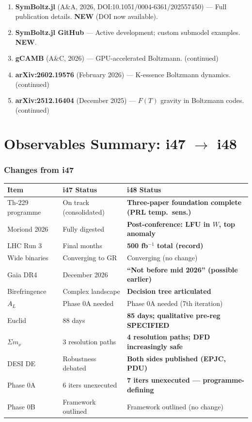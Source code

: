 \documentclass[11pt,a4paper]{article}
\newcommand{\NEW}{\textcolor{dfdblue}{\textbf{NEW}}}
\begin{document}
\begin{enumerate}
\item \textbf{SymBoltz.jl} (A\&A, 2026, DOI:10.1051/0004-6361/202557450) --- Full publication details. \NEW{} (DOI now available).
\item \textbf{SymBoltz.jl GitHub} --- Active development; custom submodel examples. \NEW.
\item \textbf{gCAMB} (A\&C, 2026) --- GPU-accelerated Boltzmann. (continued)
\item \textbf{arXiv:2602.19576} (February 2026) --- K-essence Boltzmann dynamics. (continued)
\item \textbf{arXiv:2512.16404} (December 2025) --- $F(T)$ gravity in Boltzmann codes. (continued)
\end{enumerate}


\part{Observables Summary: i47 $\to$ i48}

\section{Changes from i47}

\begin{center}
\begin{tabular}{lll}
\toprule
\textbf{Item} & \textbf{i47 Status} & \textbf{i48 Status} \\
\midrule
Th-229 programme & On track (consolidated) & \textbf{Three-paper foundation complete (PRL temp.\ sens.)} \\
Moriond 2026 & Fully digested & \textbf{Post-conference: LFU in $W$, top anomaly} \\
LHC Run 3 & Final months & \textbf{500 fb$^{-1}$ total (record)} \\
Wide binaries & Converging to GR & Converging (no change) \\
Gaia DR4 & December 2026 & \textbf{``Not before mid 2026'' (possible earlier)} \\
Birefringence & Complex landscape & \textbf{Decision tree articulated} \\
$A_L$ & Phase 0A needed & Phase 0A needed (7th iteration) \\
Euclid & 88 days & \textbf{85 days; qualitative pre-reg SPECIFIED} \\
$\Sigma m_\nu$ & 3 resolution paths & \textbf{4 resolution paths; DFD increasingly safe} \\
DESI DE & Robustness debated & \textbf{Both sides published (EPJC, PDU)} \\
Phase 0A & 6 iters unexecuted & \textbf{7 iters unexecuted --- programme-defining} \\
Phase 0B & Framework outlined & Framework outlined (no change) \\
\bottomrule
\end{tabular}
\end{center}
\end{document}
